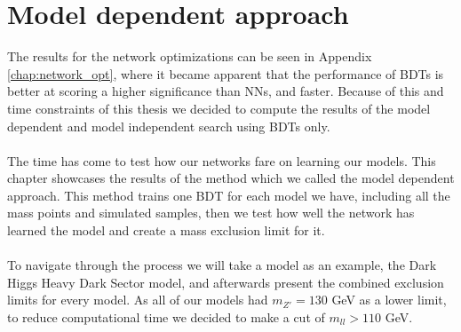 \documentclass[12pt, a4paper]{book}
\begin{document}
\chapter{Model dependent approach}\label{chap:Best_ML}
The results for the network optimizations can be seen in Appendix \ref{chap:network_opt}, where it became apparent that the performance of BDTs is better at scoring a higher significance than NNs, and faster. Because of this and time constraints of this thesis 
we decided to compute the results of the model dependent and model independent search using BDTs only. \\\\
The time has come to test how our networks fare on learning our models. This chapter showcases the results of the method which we called the model dependent approach. This method trains one BDT for each model we have, including all the mass points and simulated samples, 
then we test how well the network has learned the model and create a mass exclusion limit for it.\\
\\To navigate through the process we will take a model as an example, the Dark Higgs Heavy Dark Sector model, and afterwards present the combined exclusion limits for every model. As all of our models had $m_{Z'}=130$ GeV as a lower limit, to reduce computational time 
we decided to make a cut of $m_{ll} >110$ GeV.

\clearpage
\graphicspath{{../../../Plots/}}
\end{document}
